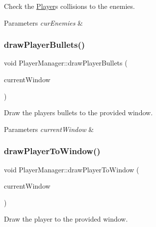 Check the \hyperlink{class_player}{Player}\textquotesingle{}s collisions to the enemies. 


\begin{DoxyParams}{Parameters}
{\em cur\+Enemies} & \\
\hline
\end{DoxyParams}
\mbox{\label{class_player_manager_a503d878624b53851c6fa25559630f544}} 
\subsubsection{\texorpdfstring{draw\+Player\+Bullets()}{drawPlayerBullets()}}
{\footnotesize\ttfamily void Player\+Manager\+::draw\+Player\+Bullets (\begin{DoxyParamCaption}\item[{sf\+::\+Render\+Window $\ast$}]{current\+Window }\end{DoxyParamCaption})}



Draw the player\textquotesingle{}s bullets to the provided window. 


\begin{DoxyParams}{Parameters}
{\em current\+Window} & \\
\hline
\end{DoxyParams}
\mbox{\label{class_player_manager_a8dfbc91721f7c9cfeae80ae7fa89602e}} 
\subsubsection{\texorpdfstring{draw\+Player\+To\+Window()}{drawPlayerToWindow()}}
{\footnotesize\ttfamily void Player\+Manager\+::draw\+Player\+To\+Window (\begin{DoxyParamCaption}\item[{sf\+::\+Render\+Window $\ast$}]{current\+Window }\end{DoxyParamCaption})}



Draw the player to the provided window. 


